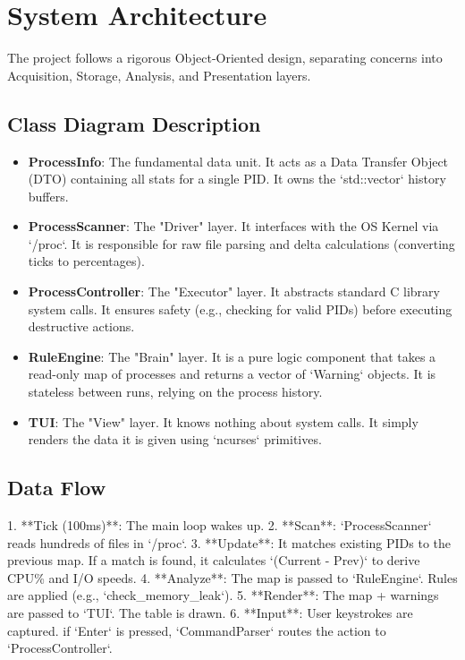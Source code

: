 \documentclass[a4paper,12pt]{article}
\begin{document}
\newpage

\section{System Architecture}

The project follows a rigorous Object-Oriented design, separating concerns into Acquisition, Storage, Analysis, and Presentation layers.

\subsection{Class Diagram Description}
\begin{itemize}
    \item \textbf{ProcessInfo}: The fundamental data unit. It acts as a Data Transfer Object (DTO) containing all stats for a single PID. It owns the `std::vector` history buffers.
    \item \textbf{ProcessScanner}: The "Driver" layer. It interfaces with the OS Kernel via `/proc`. It is responsible for raw file parsing and delta calculations (converting ticks to percentages).
    \item \textbf{ProcessController}: The "Executor" layer. It abstracts standard C library system calls. It ensures safety (e.g., checking for valid PIDs) before executing destructive actions.
    \item \textbf{RuleEngine}: The "Brain" layer. It is a pure logic component that takes a read-only map of processes and returns a vector of `Warning` objects. It is stateless between runs, relying on the process history.
    \item \textbf{TUI}: The "View" layer. It knows nothing about system calls. It simply renders the data it is given using `ncurses` primitives.
\end{itemize}

\subsection{Data Flow}
1.  **Tick (100ms)**: The main loop wakes up.
2.  **Scan**: `ProcessScanner` reads hundreds of files in `/proc`.
3.  **Update**: It matches existing PIDs to the previous map. If a match is found, it calculates `(Current - Prev)` to derive CPU\% and I/O speeds.
4.  **Analyze**: The map is passed to `RuleEngine`. Rules are applied (e.g., `check_memory_leak`).
5.  **Render**: The map + warnings are passed to `TUI`. The table is drawn.
6.  **Input**: User keystrokes are captured. if `Enter` is pressed, `CommandParser` routes the action to `ProcessController`.
\end{document}
